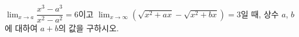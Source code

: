 $\displaystyle\lim_{x\to a}\dfrac{x^3-a^3}{x^2-a^2}=6$이고 $\displaystyle\lim_{x\to\infty}(\sqrt{x^2+ax}-\sqrt{x^2+bx})=3$일 때, 상수 $a$, $b$에 대하여 $a+b$의 값을 구하시오.
